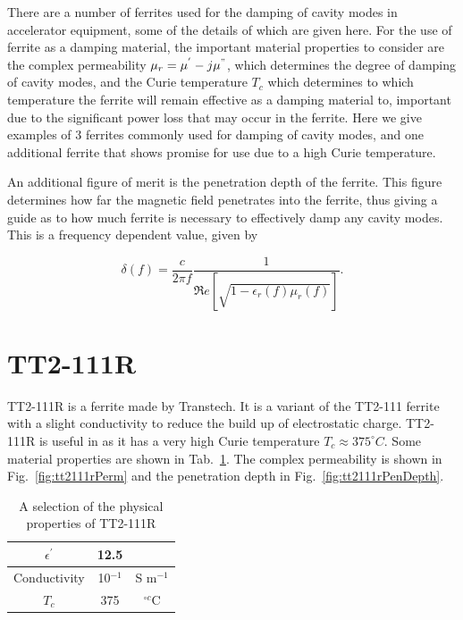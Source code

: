 \label{app:ferrProp}
There are a number of ferrites used for the damping of cavity modes in accelerator equipment, some of the details of which are given here. For the use of ferrite as a damping material, the important material properties to consider are the complex permeability $\mu_{r} = \mu^{'} - j\mu^{"}$, which determines the degree of damping of cavity modes, and the Curie temperature $T_{c}$ which determines to which temperature the ferrite will remain effective as a damping material to, important due to the significant power loss that may occur in the ferrite. Here we give examples of 3 ferrites commonly used for damping of cavity modes, and one additional ferrite that shows promise for use due to a high Curie temperature.

An additional figure of merit is the penetration depth of the ferrite. This figure determines how far the magnetic field penetrates into the ferrite, thus giving a guide as to how much ferrite is necessary to effectively damp any cavity modes. This is a frequency dependent value, given by

\begin{equation}
\delta\left( f \right) = \frac{c}{2\pi f}\frac{1}{\Re{}e\left[\sqrt{1-\epsilon_{r}\left( f \right) \mu_{r}\left( f \right)}\right]}.
\end{equation}

\section{TT2-111R}

TT2-111R is a ferrite made by Transtech. It is a variant of the TT2-111 ferrite with a slight conductivity to reduce the build up of electrostatic charge. TT2-111R is useful in as it has a very high Curie temperature $T_{c}\approx 375^{\circ}C$. Some material properties are shown in Tab.~\ref{tab:tt2111rProp}. The complex permeability is shown in Fig.~\ref{fig:tt2111rPerm} and the penetration depth in Fig.~\ref{fig:tt2111rPenDepth}.

\begin{table}
\caption{A selection of the physical properties of TT2-111R}
\label{tab:tt2111rProp}
\begin{center}
\begin{tabular}{c | c | c}
$\epsilon^{'}$ & 12.5 & \\ \hline
Conductivity  & 10$^{-1}$ & S m$^{-1}$\\ \hline
$T_{c}$ & 375 & $^{\circ c}$C \\
\end{tabular}
\end{center}
\end{table}

